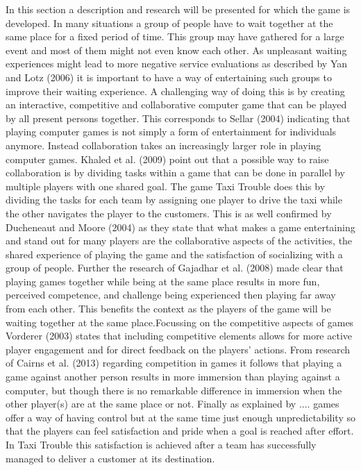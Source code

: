In this section a description and research will be presented for which the game is developed. In many situations a group of people have to wait together at the same place for a fixed period of time. This group may have gathered for a large event and most of them might not even know each other. As unpleasant waiting experiences might lead to more negative service evaluations as described by Yan and Lotz (2006) it is important to have a way of entertaining such groups to improve their waiting experience. A challenging way of doing this is by creating an interactive, competitive and collaborative computer game that can be played by all present persons together. This corresponds to Sellar (2004) indicating that playing computer games is not simply a form of entertainment for individuals anymore. Instead collaboration takes an increasingly larger role in playing computer games. Khaled et al. (2009) point out that a possible way to raise collaboration is by dividing tasks within a game that can be done in parallel by multiple players with one shared goal. The game Taxi Trouble does this by dividing the tasks for each team by assigning one player to drive the taxi while the other navigates the player to the customers. This is as well confirmed by Ducheneaut and Moore (2004) as they state that what makes a game entertaining and stand out for many players are the collaborative aspects of the activities, the shared experience of playing the game and the satisfaction of socializing with a group of people. Further the research of Gajadhar et al. (2008) made clear that playing games together while being at the same place results in more fun, perceived competence, and challenge being experienced then playing far away from each other. This benefits the context as the players of the game will be waiting together at the same place.\qquad Focussing on the competitive aspects of games Vorderer (2003) states that including competitive elements allows for more active player engagement and for direct feedback on the players' actions. From research of Cairns et al. (2013) regarding competition in games it follows that playing a game against another person results in more immersion than playing against a computer, but though there is no remarkable difference in immersion when the other player(s) are at the same place or not. Finally as explained by .... games offer a way of having control but at the same time just enough unpredictability so that the players can feel satisfaction and pride when a goal is reached after effort. In Taxi Trouble this satisfaction is achieved after a team has successfully managed to deliver a customer at its destination.